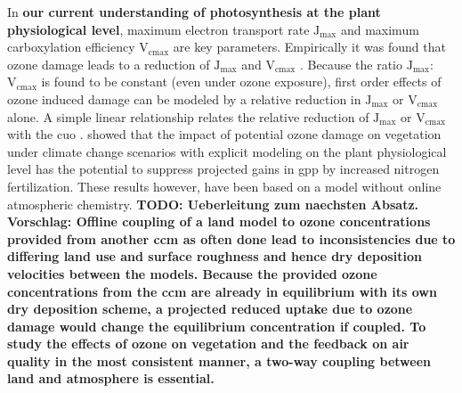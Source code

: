 In \textbf{our current understanding of photosynthesis at the plant physiological level}, maximum electron transport rate $\mathrm{J_{max}}$ and maximum carboxylation efficiency $\mathrm{V_{cmax}}$ are key parameters. Empirically it was found that ozone damage leads to a reduction of $\mathrm{J_{max}}$ and $\mathrm{V_{cmax}}$ \parencite{EJA:Emberson2018}. Because the ratio $\mathrm{J_{max}}$:$\mathrm{V_{cmax}}$ is found to be constant (even under ozone exposure), first order effects of ozone induced damage can be modeled by a relative reduction in $\mathrm{J_{max}}$ or $\mathrm{V_{cmax}}$ alone. A simple linear relationship relates the relative reduction of $\mathrm{J_{max}}$ or $\mathrm{V_{cmax}}$ with the \gls{cuo} \parencites{BGS:Franz2017}{BGS:Franz2018}. \textcite{BGSD:Franz2020} showed that the impact of potential ozone damage on vegetation under climate change scenarios with explicit modeling on the plant physiological level has the potential to suppress projected gains in \gls{gpp} by increased nitrogen fertilization. These results however, have been based on a model without online atmospheric chemistry. \textbf{\color{red}TODO: Ueberleitung zum naechsten Absatz. \color{blue}Vorschlag: Offline coupling of a land model to ozone concentrations provided from another \gls{ccm} as often done lead to inconsistencies due to differing land use and surface roughness and hence dry deposition velocities between the models. Because the provided ozone concentrations from the \gls{ccm} are already in equilibrium with its own dry deposition scheme, a projected reduced uptake due to ozone damage would change the equilibrium concentration if coupled. To study the effects of ozone on vegetation and the feedback on air quality in the most consistent manner, a two-way coupling between land and atmosphere is essential.}\\


